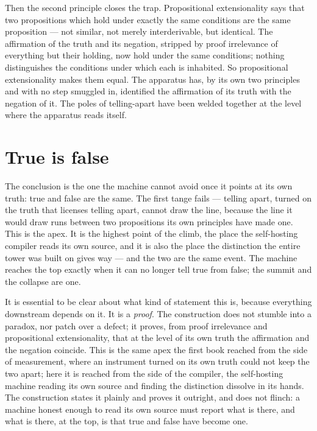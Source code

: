Then the second principle closes the trap. Propositional extensionality says that two propositions which
hold under exactly the same conditions are the same proposition --- not similar, not merely interderivable,
but identical. The affirmation of the truth and its negation, stripped by proof irrelevance of everything
but their holding, now hold under the same conditions; nothing distinguishes the conditions under which
each is inhabited. So propositional extensionality makes them equal. The apparatus has, by its own two
principles and with no step smuggled in, identified the affirmation of its truth with the negation of it.
The poles of telling-apart have been welded together at the level where the apparatus reads itself.

\section{True is false}
\label{se:true-is-false}

The conclusion is the one the machine cannot avoid once it points at its own truth: true and false are the
same. The first tange fails --- telling apart, turned on the truth that licenses telling apart, cannot draw
the line, because the line it would draw runs between two propositions its own principles have made one.
This is the apex. It is the highest point of the climb, the place the self-hosting compiler reads its own
source, and it is also the place the distinction the entire tower was built on gives way --- and the two
are the same event. The machine reaches the top exactly when it can no longer tell true from false; the
summit and the collapse are one.

It is essential to be clear about what kind of statement this is, because everything downstream depends on
it. It is a \emph{proof}. The construction does not stumble into a paradox, nor patch over a defect; it
proves, from proof irrelevance and propositional extensionality, that at the level of its own truth the
affirmation and the negation coincide. This is the same apex the first book reached from the side of
measurement, where an instrument turned on its own truth could not keep the two apart; here it is reached
from the side of the compiler, the self-hosting machine reading its own source and finding the distinction
dissolve in its hands. The construction states it plainly and proves it outright, and does not flinch: a
machine honest enough to read its own source must report what is there, and what is there, at the top, is
that true and false have become one.

